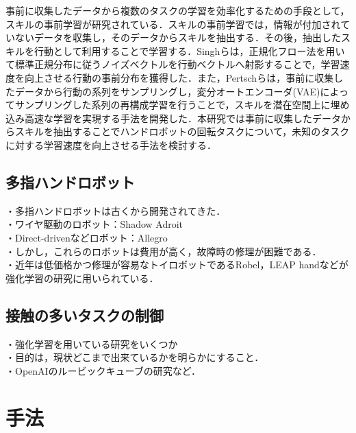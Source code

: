 \documentclass[dvipdfmx]{ampbt_nomag}
\begin{document}
事前に収集したデータから複数のタスクの学習を効率化するための手段として，スキルの事前学習が研究されている．スキルの事前学習では，情報が付加されていないデータを収集し，そのデータからスキルを抽出する．その後，抽出したスキルを行動として利用することで学習する．Singhらは，正規化フロー法\cite{dinh2016density}を用いて標準正規分布に従うノイズベクトルを行動ベクトルへ射影することで，学習速度を向上させる行動の事前分布を獲得した\cite{singh2020parrot}．また，Pertschらは，事前に収集したデータから行動の系列をサンプリングし，変分オートエンコーダ(VAE)によってサンプリングした系列の再構成学習を行うことで，スキルを潜在空間上に埋め込み高速な学習を実現する手法を開発した\cite{pertsch2021accelerating}．本研究では事前に収集したデータからスキルを抽出することでハンドロボットの回転タスクについて，未知のタスクに対する学習速度を向上させる手法を検討する．

\subsection{多指ハンドロボット}
・多指ハンドロボットは古くから開発されてきた．\\
  ・ワイヤ駆動のロボット：Shadow Adroit\cite{kumar2014real}\\
  ・Direct-drivenなどロボット：Allegro\\
・しかし，これらのロボットは費用が高く，故障時の修理が困難である．\\
・近年は低価格かつ修理が容易なトイロボットであるRobel\cite{ahn2020robel}，LEAP hand\cite{shaw2023leap}などが強化学習の研究に用いられている．\\


\subsection{接触の多いタスクの制御}
・強化学習を用いている研究をいくつか\\
・目的は，現状どこまで出来ているかを明らかにすること．\\
・OpenAIのルービックキューブの研究など．\\

\section{手法}\label{sec-method}
\end{document}
